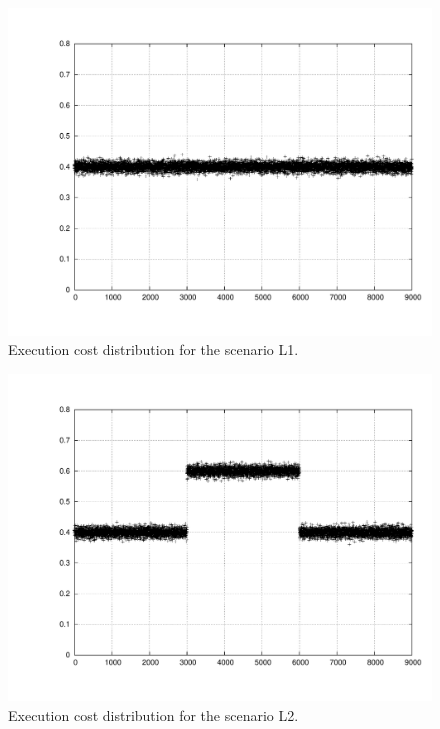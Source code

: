 \documentclass[times, 10pt,twocolumn]{article}
\begin{document}
\begin{figure}[h!t]
  \centering
  \includegraphics[scale=0.31]{trace-normal}
  \caption{Execution cost distribution for the scenario L1.}
  \label{fig:plotl1}
\end{figure}

\begin{figure}[h!t]
  \centering
  \includegraphics[scale=0.31]{trace-trifasico}
  \caption{Execution cost distribution for the scenario L2.}
  \label{fig:plotl2}
\end{figure}
\end{document}
